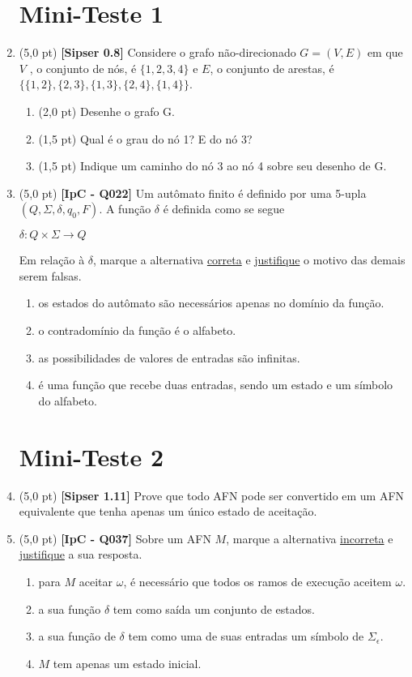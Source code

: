 \documentclass[12pt,a4paper,oneside]{article}
\begin{document}
\begin{enumerate}
	
	\section*{Mini-Teste 1}
	
	\item (5,0 pt) {\bf [Sipser 0.8]} Considere o grafo não-direcionado $G = (V, E)$ em que $V$ , o conjunto de nós, é $\{1, 2, 3, 4\}$ e $E$, o conjunto de arestas, é $\{\{1, 2\}, \{2, 3\}, \{1, 3\}, \{2, 4\}, \{1, 4\}\}$.
	\begin{enumerate}
		\item (2,0 pt) Desenhe o grafo G. 
		\item (1,5 pt) Qual é o grau do nó 1? E do nó 3? 
		\item (1,5 pt) Indique um caminho do nó 3 ao nó 4 sobre seu desenho de G.
	\end{enumerate}
	
	\item (5,0 pt) {\bf [IpC - Q022]}
	Um autômato finito é definido por uma 5-upla $(Q, \Sigma, \delta, q_0, F)$. A função $\delta$ é definida como se segue
	\begin{center}
		$\delta:Q \times \Sigma \rightarrow Q$
	\end{center}
	Em relação à $\delta$, marque a alternativa \underline{correta} e \underline{justifique} o motivo das demais serem falsas.

\begin{enumerate}
\item os estados do autômato são necessários apenas no domínio da função.
\item o contradomínio da função é o alfabeto.
\item as possibilidades de valores de entradas são infinitas.
\item é uma função que recebe duas entradas, sendo um estado e um símbolo do alfabeto.
\end{enumerate}

	\section*{Mini-Teste 2}

	\item (5,0 pt) {\bf [Sipser 1.11]} Prove que todo AFN pode ser convertido em um AFN equivalente que tenha apenas um único estado de aceitação.

	\item (5,0 pt) {\bf [IpC - Q037]} Sobre um AFN $M$, marque a alternativa \underline{incorreta} e \underline{justifique} a sua resposta.
\begin{enumerate}
\item para $M$ aceitar $\omega$, é necessário que todos os ramos de execução aceitem $\omega$.
\item a sua função $\delta$ tem como saída um conjunto de estados.
\item a sua função de $\delta$ tem como uma de suas entradas um símbolo de $\Sigma_{\epsilon}$.
\item $M$ tem apenas um estado inicial.
\end{enumerate}

\end{enumerate}
\end{document}
